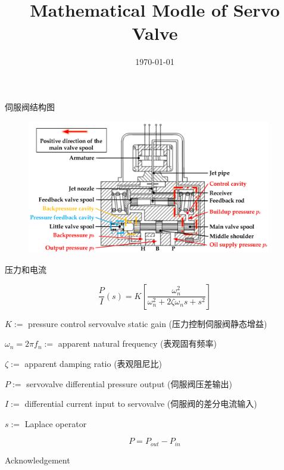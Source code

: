 \documentclass[12pt,aspectratio=169]{beamer}
\title{Mathematical Modle of Servo Valve}
\date{\today}
\author{}
\begin{document}
\maketitle
\footnotesize

\begin{frame}{伺服阀结构图}

  \begin{figure}
    \begin{center}
      \includegraphics[width=0.95\textwidth]{fig/structure.jpeg}
    \end{center}
    \caption{}\label{fig:1}
  \end{figure}

\end{frame}

\begin{frame}{压力和电流}

  \[
    \frac{P}{I}(s)=K\left[\frac{\omega_n^2}{\omega_n^2+2\zeta\omega_ns+s^2}\right]
  \]

  $K:=$ pressure control servovalve static gain (压力控制伺服阀静态增益)

  $\omega_n=2\pi f_n:=$ apparent natural frequency (表观固有频率)

  $\zeta:=$ apparent damping ratio (表观阻尼比)

  $P:=$ servovalve differential pressure output (伺服阀压差输出)

  $I:=$ differential current input to servovalve (伺服阀的差分电流输入)

  $s:=$ Laplace operator

  \[
    P=P_{out}-P_{in}
  \]

\end{frame}

\begin{frame}{Acknowledgement}

  \begin{center}

    \textcolor{gray}{\Huge{\centerline{}}}

  \end{center}

\end{frame}
\end{document}
